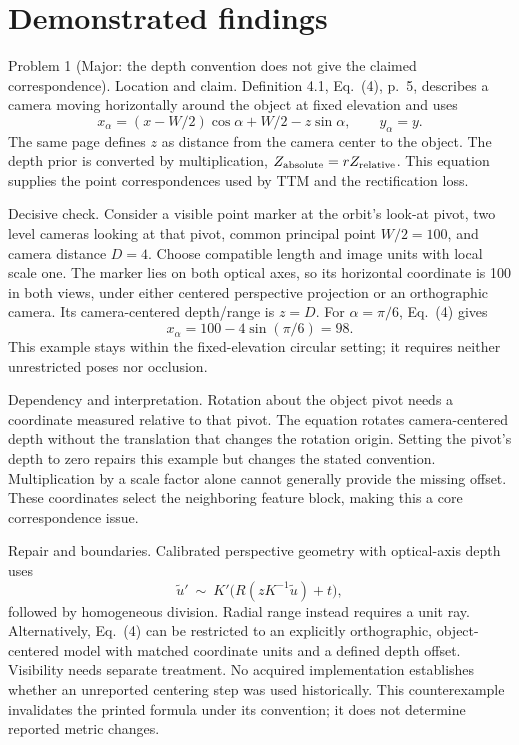\documentclass[10pt]{article}
\begin{document}
\section*{Demonstrated findings}
Problem 1 (Major: the depth convention does not give the claimed correspondence).  Location and claim. Definition 4.1, Eq. (4), p. 5, describes a camera moving horizontally around the object at fixed elevation and uses \[x_\alpha=(x-W/2)\cos\alpha+W/2-z\sin\alpha,\qquad y_\alpha=y.\] The same page defines \(z\) as distance from the camera center to the object. The depth prior is converted by multiplication, \(Z_{\rm absolute}=rZ_{\rm relative}\). This equation supplies the point correspondences used by TTM and the rectification loss.\par
Decisive check. Consider a visible point marker at the orbit’s look-at pivot, two level cameras looking at that pivot, common principal point \(W/2=100\), and camera distance \(D=4\). Choose compatible length and image units with local scale one. The marker lies on both optical axes, so its horizontal coordinate is 100 in both views, under either centered perspective projection or an orthographic camera. Its camera-centered depth/range is \(z=D\). For \(\alpha=\pi/6\), Eq. (4) gives \[x_\alpha=100-4\sin(\pi/6)=98.\] This example stays within the fixed-elevation circular setting; it requires neither unrestricted poses nor occlusion.\par
Dependency and interpretation. Rotation about the object pivot needs a coordinate measured relative to that pivot. The equation rotates camera-centered depth without the translation that changes the rotation origin. Setting the pivot’s depth to zero repairs this example but changes the stated convention. Multiplication by a scale factor alone cannot generally provide the missing offset. These coordinates select the neighboring feature block, making this a core correspondence issue.\par
Repair and boundaries. Calibrated perspective geometry with optical-axis depth uses \[\widetilde u'\ \sim\ K'\bigl(R(zK^{-1}\widetilde u)+t\bigr),\] followed by homogeneous division. Radial range instead requires a unit ray. Alternatively, Eq. (4) can be restricted to an explicitly orthographic, object-centered model with matched coordinate units and a defined depth offset. Visibility needs separate treatment. No acquired implementation establishes whether an unreported centering step was used historically. This counterexample invalidates the printed formula under its convention; it does not determine reported metric changes.\par
\end{document}
